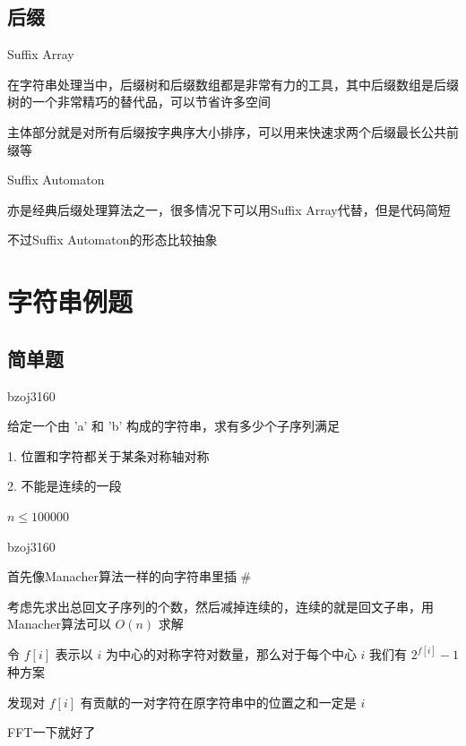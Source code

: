 \documentclass[UTF8]{beamer}
\begin{document}
		\subsection{后缀}

			\begin{frame}{Suffix Array}

			在字符串处理当中，后缀树和后缀数组都是非常有力的工具，其中后缀数组是后缀树的一个非常精巧的替代品，可以节省许多空间

			主体部分就是对所有后缀按字典序大小排序，可以用来快速求两个后缀最长公共前缀等

			\end{frame}

			\begin{frame}{Suffix Automaton}

			亦是经典后缀处理算法之一，很多情况下可以用Suffix Array代替，但是代码简短

			不过Suffix Automaton的形态比较抽象

			\end{frame}

	\section{字符串例题}

		\subsection{简单题}

			\begin{frame}{bzoj3160}

			给定一个由 'a' 和 'b' 构成的字符串，求有多少个子序列满足

			1. 位置和字符都关于某条对称轴对称

			2. 不能是连续的一段

			$n \le 100000$

			\end{frame}

			\begin{frame}{bzoj3160}

			首先像Manacher算法一样的向字符串里插 \#

			考虑先求出总回文子序列的个数，然后减掉连续的，连续的就是回文子串，用Manacher算法可以 $O(n)$ 求解

			令 $f[i]$ 表示以 $i$ 为中心的对称字符对数量，那么对于每个中心 $i$ 我们有 $2^{f[i]}-1$ 种方案

			发现对 $f[i]$ 有贡献的一对字符在原字符串中的位置之和一定是 $i$

			FFT一下就好了

			\end{frame}
\end{document}
